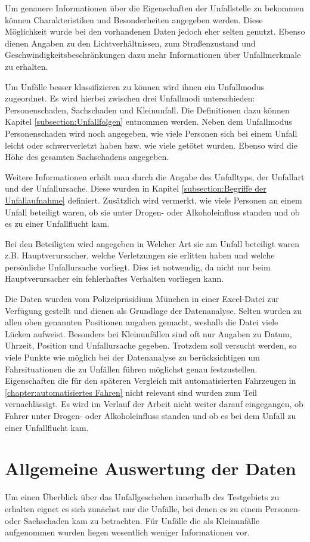 Um genauere Informationen über die Eigenschaften der Unfallstelle zu bekommen können Charakteristiken und Besonderheiten angegeben werden. Diese Möglichkeit wurde bei den vorhandenen Daten jedoch eher selten genutzt. Ebenso dienen Angaben zu den Lichtverhältnissen, zum Straßenzustand und Geschwindigkeitsbeschränkungen dazu mehr Informationen über Unfallmerkmale zu erhalten.

Um Unfälle besser klassifizieren zu können wird ihnen ein Unfallmodus zugeordnet. Es wird hierbei zwischen drei Unfallmodi unterschieden: Personenschaden, Sachschaden und Kleinunfall. Die Definitionen dazu können Kapitel \ref{subsection:Unfallfolgen} entnommen werden. Neben dem Unfallmodus Personenschaden wird noch angegeben, wie viele Personen sich bei einem Unfall leicht oder schwerverletzt haben bzw. wie viele getötet wurden. Ebenso wird die Höhe des gesamten Sachschadens angegeben.

Weitere Informationen erhält man durch die Angabe des Unfalltyps, der Unfallart und der Unfallursache. Diese wurden in Kapitel \ref{subsection:Begriffe der Unfallaufnahme} definiert. Zusätzlich wird vermerkt, wie viele Personen an einem Unfall beteiligt waren, ob sie unter Drogen- oder Alkoholeinfluss standen und ob es zu einer Unfallflucht kam. 

Bei den Beteiligten wird angegeben in Welcher Art sie am Unfall beteiligt waren z.B. Hauptverursacher, welche Verletzungen sie erlitten haben und welche persönliche Unfallursache vorliegt. Dies ist notwendig, da nicht nur beim Hauptverursacher ein fehlerhaftes Verhalten vorliegen kann.

Die Daten wurden vom Polizeipräsidium München in einer Excel-Datei zur Verfügung gestellt und dienen als Grundlage der Datenanalyse. Selten wurden zu allen oben genannten Positionen angaben gemacht, weshalb die Datei viele Lücken aufweist. Besonders bei Kleinunfällen sind oft nur Angaben zu Datum, Uhrzeit, Position und Unfallursache gegeben. Trotzdem soll versucht werden, so viele Punkte wie möglich bei der Datenanalyse zu berücksichtigen um Fahrsituationen die zu Unfällen führen möglichst genau festzustellen. Eigenschaften die für den späteren Vergleich mit automatisierten Fahrzeugen in \ref{chapter:automatisiertes Fahren} nicht relevant sind wurden zum Teil vernachlässigt. Es wird im Verlauf der Arbeit nicht weiter darauf eingegangen, ob Fahrer unter Drogen- oder Alkoholeinfluss standen und ob es bei dem Unfall zu einer Unfallflucht kam.

\section{Allgemeine Auswertung der Daten}
Um einen Überblick über das Unfallgeschehen innerhalb des Testgebiets zu erhalten eignet es sich zunächst nur die Unfälle, bei denen es zu einem Personen- oder Sachschaden kam zu betrachten. Für Unfälle die als Kleinunfälle aufgenommen wurden liegen wesentlich weniger Informationen vor.

